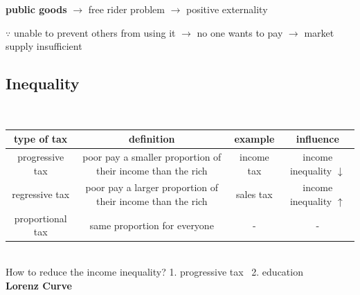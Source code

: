 \documentclass[UTF8]{article}
\begin{document}
\textbf{public goods} $\longrightarrow$ free rider problem $\longrightarrow$ positive externality

$\because$ unable to prevent others from using it $\longrightarrow$ no one wants to pay $\longrightarrow$ market supply insufficient 

\newpage
\subsection{Inequality}
\noindent
\\
\begin{tabular}{|c|c|c|c|}
    \hline
    type of tax & definition & example & influence\\
    \hline
    progressive tax & poor pay a smaller proportion of their income than the rich & income tax & income inequality $\downarrow$\\
    \hline
    regressive tax & poor pay a larger proportion of their income than the rich & sales tax & income inequality $\uparrow$\\
    \hline
    proportional tax & same proportion for everyone & - & -\\
    \hline
\end{tabular}\\

How to reduce the income inequality? 1. progressive tax \ 2. education \\

\textbf{\large Lorenz Curve}
\end{document}
